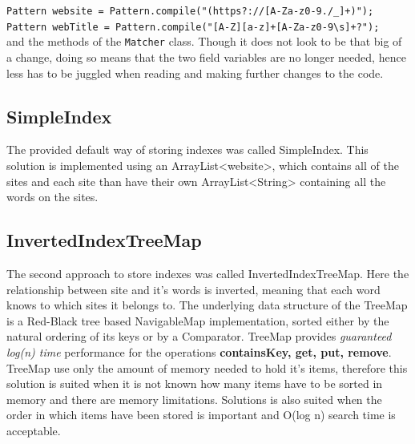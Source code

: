 {\tt Pattern website = Pattern.compile("(https?://[A-Za-z0-9./\_]+)");} \\
{\tt Pattern webTitle = Pattern.compile("[A-Z][a-z]+[A-Za-z0-9\textbackslash s]+?");} \\

and the methods of the {\tt Matcher} class. Though it does not look to be that big of a change, doing so means that the two field variables are no longer needed, hence less has to be juggled when reading and making further changes to the code.

\subsection{SimpleIndex}
The provided default way of storing indexes was called SimpleIndex. This solution is implemented using an ArrayList<website>, which contains all of the sites and each site than have their own ArrayList<String>  containing all the words on the sites. \\

\subsection{InvertedIndexTreeMap}
The second approach to store indexes was called InvertedIndexTreeMap. Here the relationship between site and it's words is inverted, meaning that each word knows to which sites it belongs to. The underlying data structure of the TreeMap is a Red-Black tree based NavigableMap implementation, sorted either by the natural ordering of its keys or by a Comparator. TreeMap provides \textit{guaranteed log(n) time} performance for the operations \textbf{containsKey, get, put, remove}.\cite{oracle:treemap} TreeMap use only the amount of memory needed to hold it's items, therefore this solution is suited when it is not known how many items have to be sorted in memory and there are memory limitations. Solutions is also suited when the order in which items have been stored is important and O(log n) search time is acceptable. \cite{baeldung:HashTreeCompared}

